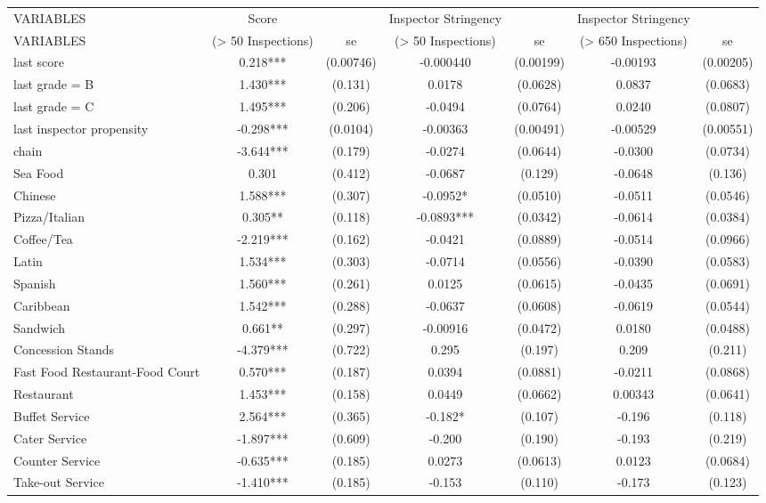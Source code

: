 \begin{tabular}{lcccccc} \hline
VARIABLES & Score &  & Inspector Stringency &     & Inspector Stringency  &  \\ 
VARIABLES & (> 50 Inspections) & se &  (> 50 Inspections) & se & (> 650 Inspections) & se \\ \hline
last score & 0.218*** & (0.00746) & -0.000440 & (0.00199) & -0.00193 & (0.00205) \\
last grade = B & 1.430*** & (0.131) & 0.0178 & (0.0628) & 0.0837 & (0.0683) \\
last grade = C & 1.495*** & (0.206) & -0.0494 & (0.0764) & 0.0240 & (0.0807) \\
last inspector propensity & -0.298*** & (0.0104) & -0.00363 & (0.00491) & -0.00529 & (0.00551) \\
chain & -3.644*** & (0.179) & -0.0274 & (0.0644) & -0.0300 & (0.0734) \\
Sea Food & 0.301 & (0.412) & -0.0687 & (0.129) & -0.0648 & (0.136) \\
Chinese & 1.588*** & (0.307) & -0.0952* & (0.0510) & -0.0511 & (0.0546) \\
Pizza/Italian & 0.305** & (0.118) & -0.0893*** & (0.0342) & -0.0614 & (0.0384) \\
Coffee/Tea & -2.219*** & (0.162) & -0.0421 & (0.0889) & -0.0514 & (0.0966) \\
Latin & 1.534*** & (0.303) & -0.0714 & (0.0556) & -0.0390 & (0.0583) \\
Spanish & 1.560*** & (0.261) & 0.0125 & (0.0615) & -0.0435 & (0.0691) \\
Caribbean & 1.542*** & (0.288) & -0.0637 & (0.0608) & -0.0619 & (0.0544) \\
Sandwich & 0.661** & (0.297) & -0.00916 & (0.0472) & 0.0180 & (0.0488) \\
Concession Stands & -4.379*** & (0.722) & 0.295 & (0.197) & 0.209 & (0.211) \\
Fast Food Restaurant-Food Court & 0.570*** & (0.187) & 0.0394 & (0.0881) & -0.0211 & (0.0868) \\
Restaurant  & 1.453*** & (0.158) & 0.0449 & (0.0662) & 0.00343 & (0.0641) \\
Buffet Service & 2.564*** & (0.365) & -0.182* & (0.107) & -0.196 & (0.118) \\
Cater Service & -1.897*** & (0.609) & -0.200 & (0.190) & -0.193 & (0.219) \\
Counter Service & -0.635*** & (0.185) & 0.0273 & (0.0613) & 0.0123 & (0.0684) \\
Take-out Service & -1.410*** & (0.185) & -0.153 & (0.110) & -0.173 & (0.123) \\

\end{tabular}
